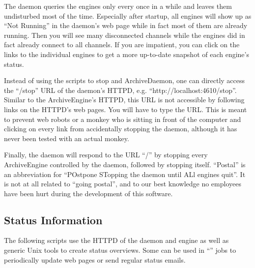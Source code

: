 \NOTE The daemon queries the engines only every once in a while and
leaves them undisturbed most of the time.
Especially after startup, all engines will show up as ``Not Running''
in the daemon's web page while in fact most of them are already
running. Then you will see many disconnected channels while the
engines did in fact already connect to all channels. 
If you are impatient, you can click on the links to the individual
engines to get a more up-to-date snapshot of each engine's status.

Instead of using the scripts to stop and ArchiveDaemon, one can
directly access the ``/stop'' URL of the daemon's HTTPD,
e.g. ``http://localhost:4610/stop''.  Similar to the ArchiveEngine's
HTTPD, this URL is not accessible by following links on the HTTPD's
web pages. You will have to type the URL. This is meant to prevent web
robots or a monkey who is sitting in front of the computer and
clicking on every link from accidentally stopping the daemon, although
it has never been tested with an actual monkey.

Finally, the daemon will respond to the URL ``/'' by stopping
every ArchiveEngine controlled by the daemon, followed by stopping
itself. ``Postal'' is an abbreviation for ``POstpone STopping the
daemon until ALl engines quit''. It is not at all related to ``going
postal'', and to our best knowledge no  employees have been hurt
during the development of this software.

\subsection{Status Information} \label{sec:example:statustools}
The following scripts use the HTTPD of the daemon and engine
as well as generic Unix tools to create status overviews.
Some can be used in ``'' jobs to periodically update
web pages or send regular status emails.

